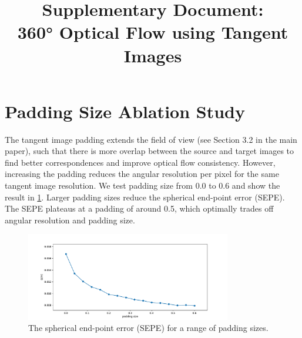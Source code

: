 \documentclass{bmvc2k}
\title{Supplementary Document:\\ 360\!° Optical Flow using Tangent Images}
\newcommand{\TODO}[1]{\textcolor{red}{{[TODO: #1]}}}
\begin{document}
\maketitle

%
%


%
%


\section{Padding Size Ablation Study}
\label{sec:sup:ablations}



The tangent image padding extends the field of view  (see Section 3.2 in the main paper), such that there is more overlap between the source and target images to find better correspondences and improve optical flow consistency.
%
However, increasing the padding reduces the angular resolution per pixel for the same tangent image resolution.
%
We test padding size from 0.0 to 0.6 and show the result in \cref{fig:sup:ablationpadding}.
Larger padding sizes reduce the spherical end-point error (SEPE).
The SEPE plateaus at a padding of around 0.5, which optimally trades off angular resolution and padding size.


\begin{figure}[hbt!]
	\centering
	\includegraphics[width=0.80\textwidth]{images/abla_padding.pdf}
	\caption{\label{fig:sup:ablationpadding}%
		The spherical end-point error (SEPE) for a range of padding sizes.}
\end{figure}
\end{document}
